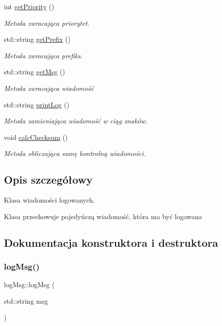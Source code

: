\begin{DoxyCompactItemize}
int \hyperlink{classlog_msg_a631e3b2a26f15c3b39b0718bcf3c3a57}{get\+Priority} ()
\begin{DoxyCompactList}\small\item\em Metoda zwracająca priorytet. \end{DoxyCompactList}\item 
std\+::string \hyperlink{classlog_msg_af10adb316ec6ba7bd7db5b4c0c5de365}{get\+Prefix} ()
\begin{DoxyCompactList}\small\item\em Metoda zwracająca prefiks. \end{DoxyCompactList}\item 
std\+::string \hyperlink{classlog_msg_a19a5752d1cc3fc6a20d8571f4cbfc422}{get\+Msg} ()
\begin{DoxyCompactList}\small\item\em Metoda zwracająca wiadomość \end{DoxyCompactList}\item 
std\+::string \hyperlink{classlog_msg_a43ba149c673ff7b4070ec5308809ccf0}{print\+Log} ()
\begin{DoxyCompactList}\small\item\em Metoda zamieniająca wiadomość w ciąg znaków. \end{DoxyCompactList}\item 
void \hyperlink{classlog_msg_a652a3f776718a2c5800267fa898f05e6}{calc\+Checksum} ()
\begin{DoxyCompactList}\small\item\em Metoda obliczająca sumę kontrolną wiadomości. \end{DoxyCompactList}\end{DoxyCompactItemize}


\subsection{Opis szczegółowy}
Klasa wiadomości logowanych. 

Klasa przechowuje pojedyńczą wiadomość, która ma być logowana 

\subsection{Dokumentacja konstruktora i destruktora}
\mbox{\label{classlog_msg_a59a223eea638eb82439786fa0b21ae99}} 
\subsubsection{\texorpdfstring{log\+Msg()}{logMsg()}\hspace{0.1cm}{\footnotesize\ttfamily [1/2]}}
{\footnotesize\ttfamily log\+Msg\+::log\+Msg (\begin{DoxyParamCaption}\item[{std\+::string}]{msg }\end{DoxyParamCaption})}



